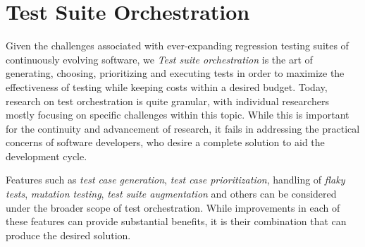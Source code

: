 \section{Test Suite Orchestration}\label{sec:orchestration}

Given the challenges associated with ever-expanding regression testing suites of continuously evolving software, we 
\textit{Test suite orchestration} is the art of generating, choosing, prioritizing and executing tests in order to maximize the effectiveness of testing while keeping costs within a desired budget.
Today, research on test orchestration is quite granular, with individual researchers mostly focusing on specific challenges within this topic.
While this is important for the continuity and advancement of research, it fails in addressing the practical concerns of software developers, who desire a complete solution to aid the development cycle.

Features such as \textit{test case generation}, \textit{test case prioritization}, handling of \textit{flaky tests}, \textit{mutation testing}, \textit{test suite augmentation} and others can be considered under the broader scope of test orchestration.
While improvements in each of these features can provide substantial benefits, it is their combination that can produce the desired solution.

